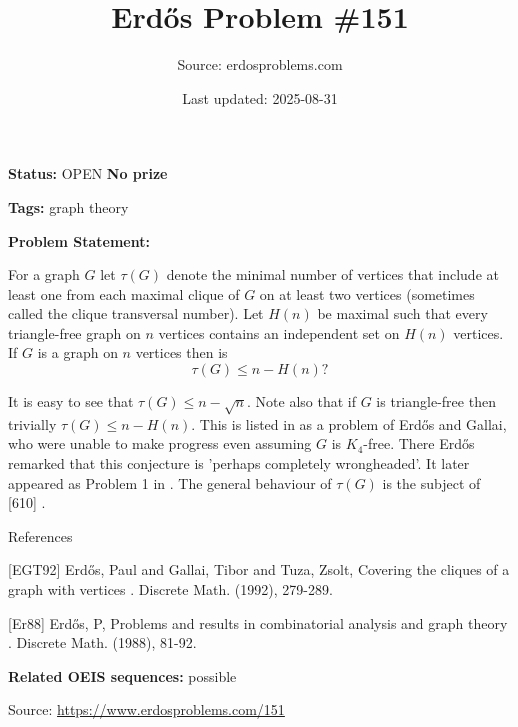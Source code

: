 \documentclass{article}
\title{Erd\H{o}s Problem \#151}
\date{Last updated: 2025-08-31}
\author{Source: erdosproblems.com}
\begin{document}
\maketitle

\noindent\textbf{Status:} OPEN \quad \textbf{No prize}

\noindent\textbf{Tags:} graph theory

\medskip

\noindent\textbf{Problem Statement:}

For a graph $G$ let $\tau(G)$ denote the minimal number of vertices that include at least one from each maximal clique of $G$ on at least two vertices (sometimes called the clique transversal number). Let $H(n)$ be maximal such that every triangle-free graph on $n$ vertices contains an independent set on $H(n)$ vertices. If $G$ is a graph on $n$ vertices then is\[\tau(G)\leq n-H(n)?\]




It is easy to see that $\tau(G) \leq n-\sqrt{n}$. Note also that if $G$ is triangle-free then trivially $\tau(G)\leq n-H(n)$. This is listed in \cite{Er88} as a problem of Erd\H{o}s and Gallai, who were unable to make progress even assuming $G$ is $K_4$-free. There Erd\H{o}s remarked that this conjecture is 'perhaps completely wrongheaded'. It later appeared as Problem 1 in \cite{EGT92}. The general behaviour of $\tau(G)$ is the subject of [610] .




References

[EGT92] Erd\H{o}s, Paul and Gallai, Tibor and Tuza, Zsolt, Covering the cliques of a graph with vertices . Discrete Math. (1992), 279-289.

[Er88] Erd\H{o}s, P, Problems and results in combinatorial analysis and graph theory . Discrete Math. (1988), 81-92.

\noindent\textbf{Related OEIS sequences:} possible


\bigskip
\noindent\small{Source: \url{https://www.erdosproblems.com/151}}
\end{document}
